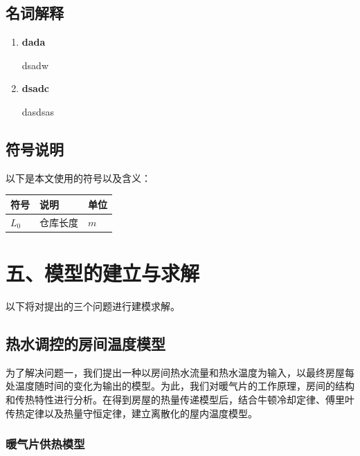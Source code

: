 \documentclass{my_paper}
\begin{document}
\subsection{名词解释}
\begin{enumerate}
    \item \textbf{dada}
    
    dsadw
    
    \item \textbf{dsadc}
    
    dasdsas

    
\end{enumerate}
\subsection{符号说明}
以下是本文使用的符号以及含义：
\begin{table}[h]%
    \centering
    \begin{tabular}{p{2.0cm}<{\centering}p{9.0cm}<{\centering}p{2.0cm}<{\centering}}
    \hline
    符号 & 说明 & 单位 \\ %
    \hline
    $L_0$ & 仓库长度 &  $m$\\
    
    \hline
    \end{tabular}
\end{table}

\section{五、模型的建立与求解}

以下将对提出的三个问题进行建模求解。
\subsection{热水调控的房间温度模型}

为了解决问题一，我们提出一种以房间热水流量和热水温度为输入，以最终房屋每处温度随时间的变化为输出的模型。为此，我们对暖气片的工作原理，房间的结构和传热特性进行分析。在得到房屋的热量传递模型后，结合牛顿冷却定律、傅里叶传热定律以及热量守恒定律，建立离散化的屋内温度模型。

\subsubsection{暖气片供热模型}
\end{document}
